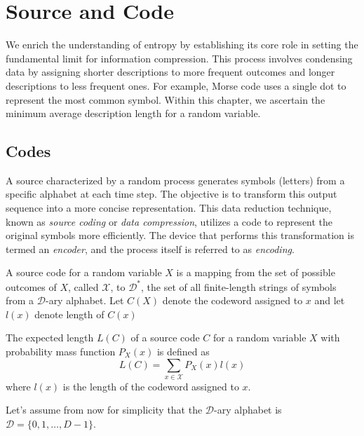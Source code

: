 \section{Source and Code}

We enrich the understanding of entropy by establishing its core role in setting the fundamental limit for information compression. This process involves condensing data by assigning shorter descriptions to more frequent outcomes and longer descriptions to less frequent ones. For example, Morse code uses a single dot to represent the most common symbol. Within this chapter, we ascertain the minimum average description length for a random variable. \cite{ElementsofInformationTheory}

\subsection{Codes}

A source characterized by a random process generates symbols (letters) from a specific alphabet at each time step. The objective is to transform this output sequence into a more concise representation. This data reduction technique, known as \emph{source coding} or \emph{data compression}, utilizes a code to represent the original symbols more efficiently. The device that performs this transformation is termed an \emph{encoder}, and the process itself is referred to as \emph{encoding}. \cite{han2002mathematics}

\begin{definition}\label{def:code}
    A source code for a random variable $X$ is a mapping from the set of possible outcomes of $X$, called $\mathcal{X}$, to $\mathcal{D}^*$, the set of all finite-length strings of symbols from a $\mathcal{D}$-ary alphabet. Let $C(X)$ denote the codeword assigned to $x$ and let $l(x)$ denote length of $C(x)$
\end{definition}

\begin{definition}\label{def:expected_length}
    The expected length $L(C)$ of a source code $C$ for a random variable $X$ with probability mass function $P_X(x)$ is defined as
    \begin{equation}
        L(C) = \sum_{x\in\mathcal{X}} P_X(x)l(x)
    \end{equation}
    where $l(x)$ is the length of the codeword assigned to $x$.
\end{definition}
Let's assume from now for simplicity that the $\mathcal{D}$-ary alphabet is $\mathcal{D} = \{0, 1, \ldots, D-1\}$.

